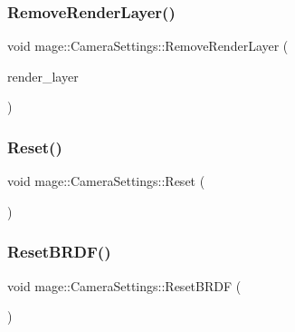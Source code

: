 \subsubsection{\texorpdfstring{Remove\+Render\+Layer()}{RemoveRenderLayer()}}
{\footnotesize\ttfamily void mage\+::\+Camera\+Settings\+::\+Remove\+Render\+Layer (\begin{DoxyParamCaption}\item[{\hyperlink{namespacemage_a8b4a82582105b0299e2c2be5af7255d6}{Render\+Layer}}]{render\+\_\+layer }\end{DoxyParamCaption})\hspace{0.3cm}{\ttfamily [noexcept]}}

\hypertarget{classmage_1_1_camera_settings_a4894cae6954c111339be554e8dd9562c}{}\label{classmage_1_1_camera_settings_a4894cae6954c111339be554e8dd9562c} 
\subsubsection{\texorpdfstring{Reset()}{Reset()}}
{\footnotesize\ttfamily void mage\+::\+Camera\+Settings\+::\+Reset (\begin{DoxyParamCaption}{ }\end{DoxyParamCaption})\hspace{0.3cm}{\ttfamily [noexcept]}}

\hypertarget{classmage_1_1_camera_settings_a1f8b3952282d153db4fb6416e9d933b7}{}\label{classmage_1_1_camera_settings_a1f8b3952282d153db4fb6416e9d933b7} 
\subsubsection{\texorpdfstring{Reset\+B\+R\+D\+F()}{ResetBRDF()}}
{\footnotesize\ttfamily void mage\+::\+Camera\+Settings\+::\+Reset\+B\+R\+DF (\begin{DoxyParamCaption}{ }\end{DoxyParamCaption})\hspace{0.3cm}{\ttfamily [noexcept]}}

\hypertarget{classmage_1_1_camera_settings_afc9bcdb1f27adfb1c69a668a24113b46}{}\label{classmage_1_1_camera_settings_afc9bcdb1f27adfb1c69a668a24113b46} 
